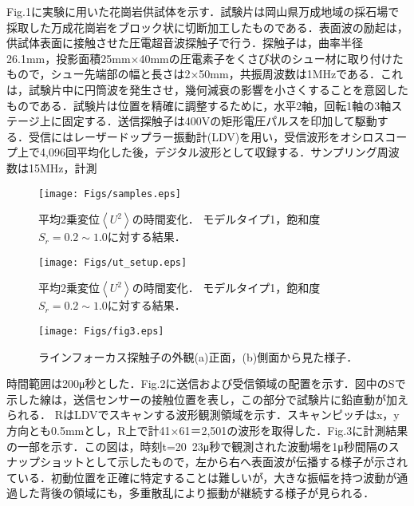﻿%
Fig.1に実験に用いた花崗岩供試体を示す．試験片は岡山県万成地域の採石場で採取した万成花崗岩をブロック状に切断加工したものである．表面波の励起は，供試体表面に接触させた圧電超音波探触子で行う．探触子は，曲率半径26.1mm，投影面積25mm×40mmの圧電素子をくさび状のシュー材に取り付けたもので，シュー先端部の幅と長さは2×50mm，共振周波数は1MHzである．これは，試験片中に円筒波を発生させ，幾何減衰の影響を小さくすることを意図したものである．試験片は位置を精確に調整するために，水平2軸，回転1軸の3軸ステージ上に固定する．送信探触子は400Vの矩形電圧パルスを印加して駆動する．受信にはレーザードップラー振動計(LDV)を用い，受信波形をオシロスコープ上で4,096回平均化した後，デジタル波形として収録する．サンプリング周波数は15MHz，計測
\begin{figure}
\begin{center}
\texttt{[image: Figs/samples.eps]}
\caption{
	平均2乗変位$\left<U^2\right>$の時間変化．
	モデルタイプ1，飽和度$S_r=0.2\sim 1.0$に対する結果．
}
\label{fig:fig1}
\end{center}
\end{figure}
\begin{figure}[t]
\begin{center}
\texttt{[image: Figs/ut\_setup.eps]}
\caption{
	平均2乗変位$\left<U^2\right>$の時間変化．
	モデルタイプ1，飽和度$S_r=0.2\sim 1.0$に対する結果．
}
\label{fig:fig2}
\end{center}
\end{figure}
\begin{figure}[h]
\begin{center}
\texttt{[image: Figs/fig3.eps]}
\caption{
	ラインフォーカス探触子の外観(a)正面，(b)側面から見た様子．
}
\label{fig:fig3}
\end{center}
\end{figure}
時間範囲は200μ秒とした．Fig.2に送信および受信領域の配置を示す．図中のSで示した線は，送信センサーの接触位置を表し，この部分で試験片に鉛直動が加えられる． RはLDVでスキャンする波形観測領域を示す．スキャンピッチはx，y方向とも0.5mmとし，R上で計41×61＝2,501の波形を取得した．Fig.3に計測結果の一部を示す．この図は，時刻t=20~23μ秒で観測された波動場を1μ秒間隔のスナップショットとして示したもので，左から右へ表面波が伝播する様子が示されている．初動位置を正確に特定することは難しいが，大きな振幅を持つ波動が通過した背後の領域にも，多重散乱により振動が継続する様子が見られる．

